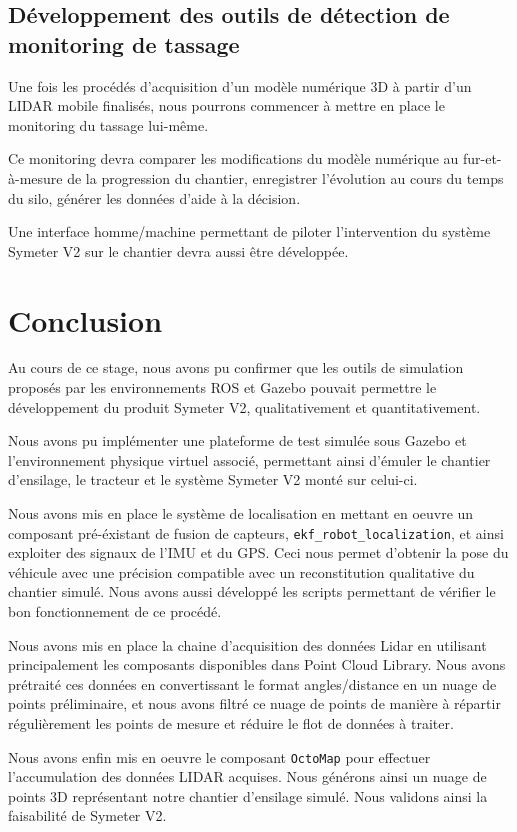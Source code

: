 \documentclass[12pt,a4paper]{report}
\begin{document}
\section{Développement des outils de détection de monitoring de tassage}
Une fois les procédés d'acquisition d'un modèle numérique 3D à partir d'un LIDAR mobile finalisés, nous pourrons commencer à mettre en place le monitoring du tassage lui-même.

\para Ce monitoring devra comparer les modifications du modèle numérique au fur-et-à-mesure de la progression du chantier, enregistrer l'évolution au cours du temps du silo, générer les données d'aide à la décision.

\para Une interface homme/machine permettant de piloter l'intervention du système Symeter V2 sur le chantier devra aussi être développée. 


\chapter{Conclusion}

Au cours de ce stage, nous avons pu confirmer que les outils de simulation proposés par les environnements  ROS et Gazebo pouvait permettre le développement du produit Symeter V2, qualitativement et quantitativement.

\para Nous avons pu implémenter une plateforme de test simulée sous Gazebo et l'environnement physique virtuel associé, permettant ainsi d'émuler le chantier d'ensilage, le tracteur et le système Symeter V2 monté sur celui-ci.

\para Nous avons mis en place le système de localisation en mettant en oeuvre un composant pré-éxistant de fusion de capteurs, \verb|ekf_robot_localization|, et ainsi exploiter des signaux de l'IMU et du GPS. Ceci nous permet d'obtenir la pose du véhicule avec une précision compatible avec un reconstitution qualitative du chantier simulé. Nous avons aussi développé les scripts permettant de vérifier le bon fonctionnement de ce procédé.

\para Nous avons mis en place la chaine d'acquisition des données Lidar en utilisant principalement les composants disponibles dans Point Cloud Library. Nous avons prétraité ces données en convertissant le format angles/distance en un nuage de points préliminaire, et nous avons filtré ce nuage de points de manière à répartir régulièrement les points de mesure et réduire le flot de données à traiter.

\para Nous avons enfin mis en oeuvre le composant \verb|OctoMap| pour effectuer l'accumulation des données LIDAR acquises. Nous générons ainsi un nuage de points 3D représentant notre chantier d'ensilage simulé. Nous validons ainsi la faisabilité de Symeter V2.
\end{document}
